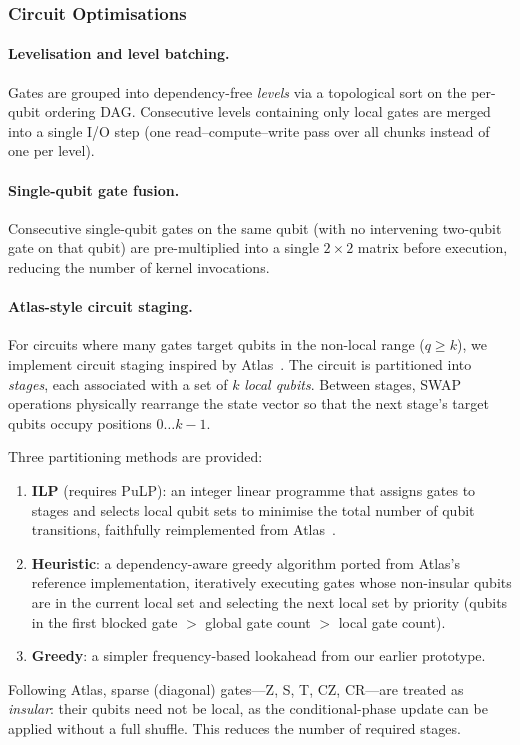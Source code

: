 \subsubsection{Circuit Optimisations}
\label{sec:circuit-opt}

\paragraph{Levelisation and level batching.}
Gates are grouped into dependency-free \emph{levels} via a topological
sort on the per-qubit ordering DAG. Consecutive levels containing only
local gates are merged into a single I/O step (one read--compute--write
pass over all chunks instead of one per level).

\paragraph{Single-qubit gate fusion.}
Consecutive single-qubit gates on the same qubit (with no intervening
two-qubit gate on that qubit) are pre-multiplied into a single
$2\!\times\!2$ matrix before execution, reducing the number of kernel
invocations.

\paragraph{Atlas-style circuit staging.}
For circuits where many gates target qubits in the non-local range
($q \geq k$), we implement circuit staging inspired by Atlas~\cite{atlas}.
The circuit is partitioned into \emph{stages}, each associated with a
set of $k$ \emph{local qubits}. Between stages, SWAP operations
physically rearrange the state vector so that the next stage's target
qubits occupy positions $0\ldots k{-}1$.

Three partitioning methods are provided:
\begin{enumerate}
  \item \textbf{ILP} (requires PuLP): an integer linear programme that
    assigns gates to stages and selects local qubit sets to minimise
    the total number of qubit transitions, faithfully reimplemented from
    Atlas~\cite{atlas}.
  \item \textbf{Heuristic}: a dependency-aware greedy algorithm ported
    from Atlas's reference implementation, iteratively executing gates
    whose non-insular qubits are in the current local set and selecting
    the next local set by priority (qubits in the first blocked gate
    $>$ global gate count $>$ local gate count).
  \item \textbf{Greedy}: a simpler frequency-based lookahead from our
    earlier prototype.
\end{enumerate}
Following Atlas, sparse (diagonal) gates---Z, S, T, CZ, CR---are
treated as \emph{insular}: their qubits need not be local, as the
conditional-phase update can be applied without a full shuffle. This
reduces the number of required stages.

